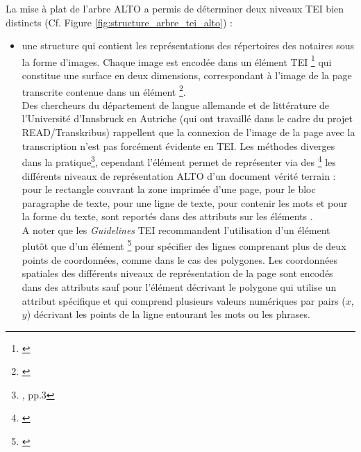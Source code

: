 La mise à plat de l'arbre ALTO a permis de déterminer deux niveaux TEI bien distincts (Cf. Figure \ref{fig:structure_arbre_tei_alto}) : 
\begin{itemize}
    \item une structure  qui contient les représentations des répertoires des notaires sous la forme d'images. Chaque image est encodée dans un élément TEI \footnote{\cite{tei_tei_nodate-15}} qui constitue une surface en deux dimensions, correspondant à l'image de la page transcrite contenue dans un élément \footnote{\cite{tei_tei_nodate-14}}.\\
    Des chercheurs du département de langue allemande et de littérature de l'Université d'Innsbruck en Autriche (qui ont travaillé dans le cadre du projet READ/Transkribus) rappellent que la connexion de l'image de la page avec la transcription n'est pas forcément évidente en TEI. Les méthodes diverges dans la pratique\footnote{\cite{muhlberger_preprint_nodate}, pp.3}, cependant l'élément  permet de représenter via des  \footnote{\cite{tei_tei_nodate-13}} les différents niveaux de représentation ALTO d'un document vérité terrain :  pour le rectangle couvrant la zone imprimée d'une page,  pour le bloc paragraphe de texte,  pour une ligne de texte,  pour contenir les mots et  pour la forme du texte, sont reportés dans des attributs  sur les éléments .\\
    A noter que les \textit{Guidelines} TEI recommandent l'utilisation d'un élément  plutôt que d'un élément \footnote{\cite{tei_tei_nodate-12}} pour spécifier des lignes comprenant plus de deux points de coordonnées, comme dans le cas des polygones. Les coordonnées spatiales des différents niveaux de représentation de la page sont encodés dans des attributs  sauf pour l'élément  décrivant le polygone qui utilise un attribut  spécifique et qui comprend plusieurs valeurs numériques par pairs ($x$,$y$) décrivant les points de la ligne entourant les mots ou les phrases.\\

\end{itemize}
